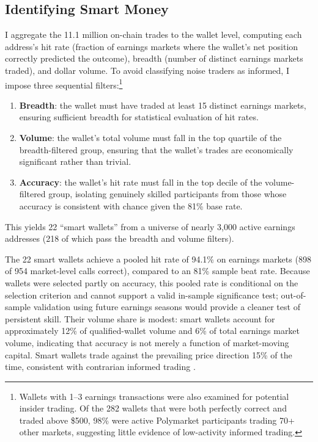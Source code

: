 \documentclass[11pt]{article}
\begin{document}
\subsection{Identifying Smart Money}

I aggregate the 11.1 million on-chain trades to the wallet level, computing each address's hit rate (fraction of earnings markets where the wallet's net position correctly predicted the outcome), breadth (number of distinct earnings markets traded), and dollar volume. To avoid classifying noise traders as informed, I impose three sequential filters:\footnote{Wallets with 1--3 earnings transactions were also examined for potential insider trading. Of the 282 wallets that were both perfectly correct and traded above \$500, 98\% were active Polymarket participants trading 70+ other markets, suggesting little evidence of low-activity informed trading.}
\begin{enumerate}
\item \textbf{Breadth}: the wallet must have traded at least 15 distinct earnings markets, ensuring sufficient breadth for statistical evaluation of hit rates.
\item \textbf{Volume}: the wallet's total volume must fall in the top quartile of the breadth-filtered group, ensuring that the wallet's trades are economically significant rather than trivial.
\item \textbf{Accuracy}: the wallet's hit rate must fall in the top decile of the volume-filtered group, isolating genuinely skilled participants from those whose accuracy is consistent with chance given the 81\% base rate.
\end{enumerate}

This yields 22 ``smart wallets'' from a universe of nearly 3,000 active earnings addresses (218 of which pass the breadth and volume filters).

The 22 smart wallets achieve a pooled hit rate of 94.1\% on earnings markets (898 of 954 market-level calls correct), compared to an 81\% sample beat rate. Because wallets were selected partly on accuracy, this pooled rate is conditional on the selection criterion and cannot support a valid in-sample significance test; out-of-sample validation using future earnings seasons would provide a cleaner test of persistent skill. Their volume share is modest: smart wallets account for approximately 12\% of qualified-wallet volume and 6\% of total earnings market volume, indicating that accuracy is not merely a function of market-moving capital. Smart wallets trade against the prevailing price direction 15\% of the time, consistent with contrarian informed trading \citep{kyle1985continuous}.
\end{document}
